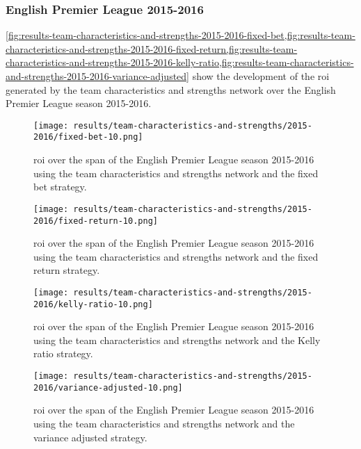 \subsubsection{English Premier League 2015-2016}

\cref{fig:results-team-characteristics-and-strengths-2015-2016-fixed-bet,fig:results-team-characteristics-and-strengths-2015-2016-fixed-return,fig:results-team-characteristics-and-strengths-2015-2016-kelly-ratio,fig:results-team-characteristics-and-strengths-2015-2016-variance-adjusted} show the development of the \gls{roi} generated by the team characteristics and strengths network over the English Premier League season 2015-2016.
\begin{figure}
    \centering
    \texttt{[image: results/team-characteristics-and-strengths/2015-2016/fixed-bet-10.png]}
    \caption{\gls{roi} over the span of the English Premier League season 2015-2016 using the team characteristics and strengths network and the fixed bet strategy.}
    \label{fig:results-team-characteristics-and-strengths-2015-2016-fixed-bet}
\end{figure}
\begin{figure}
    \centering
    \texttt{[image: results/team-characteristics-and-strengths/2015-2016/fixed-return-10.png]}
    \caption{\gls{roi} over the span of the English Premier League season 2015-2016 using the team characteristics and strengths network and the fixed return strategy.}
    \label{fig:results-team-characteristics-and-strengths-2015-2016-fixed-return}
\end{figure}
\begin{figure}
    \centering
    \texttt{[image: results/team-characteristics-and-strengths/2015-2016/kelly-ratio-10.png]}
    \caption{\gls{roi} over the span of the English Premier League season 2015-2016 using the team characteristics and strengths network and the Kelly ratio strategy.}
    \label{fig:results-team-characteristics-and-strengths-2015-2016-kelly-ratio}
\end{figure}
\begin{figure}
    \centering
    \texttt{[image: results/team-characteristics-and-strengths/2015-2016/variance-adjusted-10.png]}
    \caption{\gls{roi} over the span of the English Premier League season 2015-2016 using the team characteristics and strengths network and the variance adjusted strategy.}
    \label{fig:results-team-characteristics-and-strengths-2015-2016-variance-adjusted}
\end{figure}

